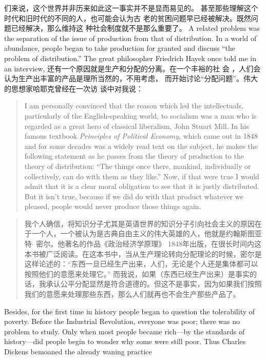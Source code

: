 \begin{paracol}{2}
们来说，这个世界并非历来如此这一事实并不是显而易见的。
甚至那些理解这个时代和旧时代的不同的人，也可能会认为古
老的贫困问题早已经被解决。既然问题已经解决，那么维持这
种社会制度就不是那么重要了。
\switchcolumn*
A related problem was the separation of the issue of production from that of distribution. In a world of abundance, people
began to take production for granted and discuss ``the problem
of distribution.'' The great philosopher Friedrich Hayek once
told me in an interview,
\switchcolumn
还有一个原因就是生产和分配的分离。在一个丰裕的社
会 ，人们会认为生产出丰富的产品是理所当然的，不用考虑，
而开始讨论“分配问题”。伟大的思想家哈耶克曾经在一次访
谈中对我说：
\switchcolumn*
\begin{quote}
I am personally convinced that the reason which led the intellectuals, particularly of the English-speaking world, to socialism
was a man who is regarded as a great hero of classical liberalism,
John Stuart Mill. In his famous textbook \textit{Principles of Political Economy}, which came out in 1848 and for some decades was a
widely read text on the subject, he makes the following statement as he passes from the theory of production to the theory of distribution: ``The things once there, mankind, individually or
collectively, can do with them as they like.'' Now, if that were
true I would admit that it is a clear moral obligation to see that it
is justly distributed. But it isn't true, because if we did do with
that product whatever we pleased, people would never produce
those things again.
\end{quote}
\switchcolumn
\begin{quote}
我个人确信，将知识分子尤其是英语世界的知识分子引向社会主义的原因在于一个人，一个被认为是古典自由主义的伟大英雄的人，他就是约翰斯图亚特$\cdot$ 密尔。他著名的作品《政治经济学原理》 1848年出版，在很长时间内这本书被广泛阅读。在这本书中，当从生产理论转向分配理论的时候，密尔是这样论述的：“东西一旦已经生产出来，人们，无论是个人还是集体都可以按照他们的意愿来处理它。” 而我说，如果（东西已经生产出来）是事实的话，我承认公平分配显然是符合道德的。但这不是事实，因为如果我们按照我们的意愿来处理那些东西，那么人们就再也不会生产那些产品了。
\end{quote}
\switchcolumn*
Besides, for the first time in history people began to question the tolerability of poverty. Before the Industrial Revolution, everyone was poor; there was no problem to study. Only
when most people became rich---by the standards of history---did people begin to wonder why some were still poor.
Thus Charles Dickens bemoaned the already waning practice

\end{paracol}
